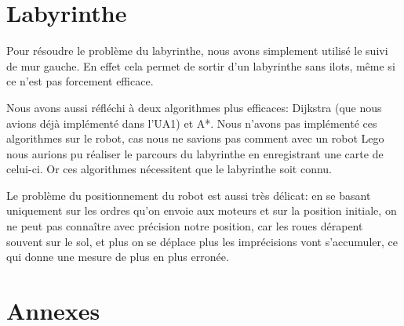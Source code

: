 \documentclass{scrartcl}
\begin{document}
\section{Labyrinthe}
  Pour résoudre le problème du labyrinthe, nous avons simplement utilisé le
  suivi de mur gauche. En effet cela permet de sortir d'un labyrinthe sans
  ilots, même si ce n'est pas forcement efficace.

  Nous avons aussi réfléchi à deux algorithmes plus efficaces: Dijkstra (que
  nous avions déjà implémenté dans l'UA1) et A*.  Nous n'avons pas implémenté
  ces algorithmes sur le robot, cas nous ne savions pas comment avec un robot
  Lego nous aurions pu réaliser le parcours du labyrinthe en enregistrant une
  carte de celui-ci. Or ces algorithmes nécessitent que le labyrinthe soit
  connu.

  Le problème du positionnement du robot est aussi très délicat: en se basant
  uniquement sur les ordres qu'on envoie aux moteurs et sur la position initiale,
  on ne peut pas connaître avec précision notre position, car les roues dérapent
  souvent sur le sol, et plus on se déplace plus les imprécisions vont
  s'accumuler, ce qui donne une mesure de plus en plus erronée.

\section{Annexes}
\lstlistoflistings

\end{document}
